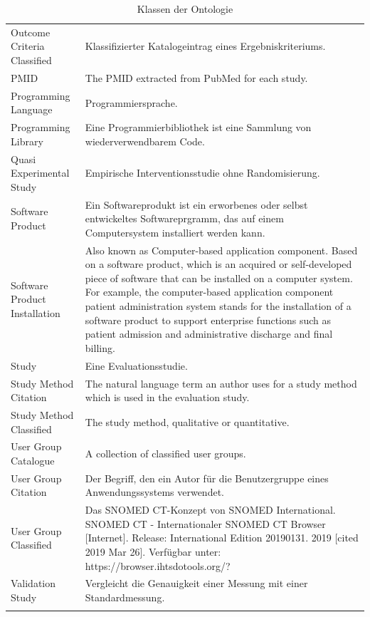 \begin{longtable}[ht]{p{} p{8cm}}
Outcome Criteria Classified & Klassifizierter Katalogeintrag eines Ergebniskriteriums. \\
PMID & The PMID extracted from PubMed for each study. \\
Programming Language & Programmiersprache. \\ 
Programming \newline Library & Eine Programmierbibliothek ist eine Sammlung von wiederverwendbarem Code. \\
Quasi Experimental Study & Empirische Interventionsstudie ohne Randomisierung. \\
Software Product & Ein Softwareprodukt ist ein erworbenes oder selbst entwickeltes Softwareprgramm, das auf einem Computersystem installiert werden kann. \\
Software Product \newline Installation & Also known as Computer-based application component. Based on a software product, which is an acquired or self-developed piece of software that can be installed on a computer system. For example, the computer-based application component patient administration system stands for the installation of a software product to support enterprise functions such as patient admission and administrative discharge and final billing. \\
Study & Eine Evaluationsstudie. \\
Study Method Citation & The natural language term an author uses for a study method which is used in the evaluation study. \\
Study Method \newline Classified & The study method, qualitative or quantitative. \\
User Group \newline Catalogue & A collection of classified user groups. \\
User Group Citation & Der Begriff, den ein Autor für die Benutzergruppe eines Anwendungssystems verwendet. \\
User Group \newline Classified & Das SNOMED CT-Konzept von SNOMED International. SNOMED CT - Internationaler SNOMED CT Browser [Internet]. Release: International Edition 20190131. 2019 [cited 2019 Mar 26]. Verfügbar unter: https://browser.ihtsdotools.org/? \\
Validation Study & Vergleicht die Genauigkeit einer Messung mit einer Standardmessung.\\
\bottomrule
\caption{Klassen der Ontologie}
\label{tab:hito_klassen}
\end{longtable}

